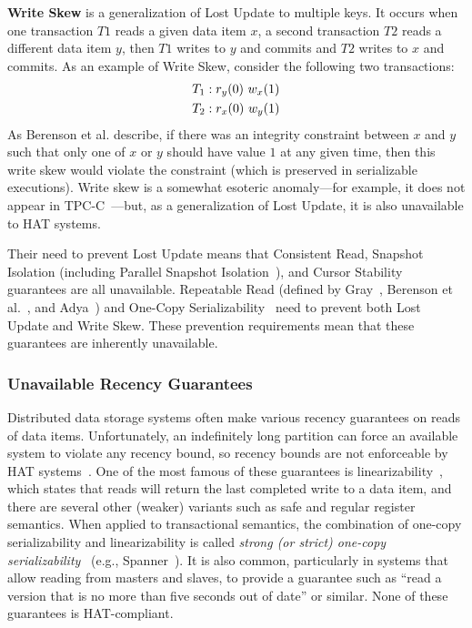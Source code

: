 \textbf{Write Skew} is a generalization of Lost Update to multiple
keys. It occurs when one transaction $T1$ reads a given data item $x$,
a second transaction $T2$ reads a different data item $y$, then $T1$
writes to $y$ and commits and $T2$ writes to $x$ and commits. As an
example of Write Skew, consider the following two transactions:
\begin{align*}
\small
T_1 &: r_y(0)~w_x(1)
\\T_2 &: r_x(0)~w_y(1)
\end{align*}
As Berenson et al. describe, if there was an integrity constraint
between $x$ and $y$ such that only one of $x$ or $y$ should have value
$1$ at any given time, then this write skew would violate the constraint (which is preserved in serializable executions). Write skew is a somewhat
esoteric anomaly---for example, it does not appear in
TPC-C~\cite{snapshot-serializable}---but, as a generalization of Lost
Update, it is also unavailable to HAT systems.

Their need to prevent Lost Update means that Consistent Read, Snapshot
Isolation (including Parallel Snapshot Isolation~\cite{walter}), and
Cursor Stability guarantees are all unavailable.  Repeatable Read
(defined by Gray~\cite{gray-isolation}, Berenson et
al.~\cite{ansicritique}, and Adya~\cite{adya}) and One-Copy
Serializability~\cite{1sr} need to prevent both Lost Update and Write Skew. These
prevention requirements mean that these guarantees are inherently
unavailable.

\subsubsection{Unavailable Recency Guarantees}

Distributed data storage systems often make various recency guarantees
on reads of data items.  Unfortunately, an indefinitely long partition
can force an available system to violate any recency bound, so recency
bounds are not enforceable by HAT systems~\cite{gilbert-cap}. One of
the most famous of these guarantees is
linearizability~\cite{herlihy-art}, which states that reads will
return the last completed write to a data item, and there are several
other (weaker) variants such as safe and regular register
semantics. When applied to transactional semantics, the combination of
one-copy serializability and linearizability is called \textit{strong
  (or strict) one-copy serializability}~\cite{adya} (e.g.,
Spanner~\cite{spanner}). It is also common, particularly in systems
that allow reading from masters and slaves, to provide a guarantee
such as ``read a version that is no more than five seconds out of
date'' or similar. None of these guarantees is HAT-compliant.

